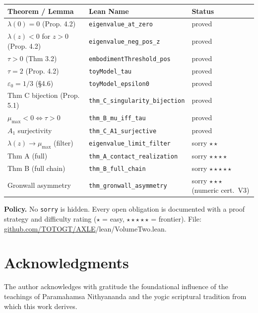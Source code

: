 \documentclass[11pt]{article}
\theoremstyle{boxed}
\begin{document}
\begin{longtable}{lll}
\toprule
\textbf{Theorem / Lemma} & \textbf{Lean Name} & \textbf{Status}\\
\midrule
\endhead
$\lambda(0) = 0$ (Prop. 4.2)                & \texttt{eigenvalue\_at\_zero}        & proved\\
$\lambda(z) < 0$ for $z>0$ (Prop. 4.2)      & \texttt{eigenvalue\_neg\_pos\_z}     & proved\\
$\tau > 0$ (Thm 3.2)                        & \texttt{embodimentThreshold\_pos}    & proved\\
$\tau = 2$ (Prop. 4.2)                      & \texttt{toyModel\_tau}               & proved\\
$\varepsilon_0 = 1/3$ (\S 4.6)              & \texttt{toyModel\_epsilon0}          & proved\\
Thm C bijection (Prop. 5.1)                 & \texttt{thm\_C\_singularity\_bijection} & proved\\
$\mu_{\max} < 0 \iff \tau > 0$              & \texttt{thm\_B\_mu\_iff\_tau}        & proved\\
$A_1$ surjectivity                          & \texttt{thm\_C\_A1\_surjective}      & proved\\
$\lambda(z) \to \mu_{\max}$ (filter)        & \texttt{eigenvalue\_limit\_filter}   & sorry $\star\star$\\
Thm A (full)                                & \texttt{thm\_A\_contact\_realization} & sorry $\star\star\star\star$\\
Thm B (full chain)                          & \texttt{thm\_B\_full\_chain}         & sorry $\star\star\star\star\star$\\
Gronwall asymmetry                          & \texttt{thm\_gronwall\_asymmetry}    & sorry $\star\star\star$ (numeric cert.\ V3)\\
\bottomrule
\end{longtable}

\textbf{Policy.} No \texttt{sorry} is hidden. Every open obligation is documented with
a proof strategy and difficulty rating ($\star$ = easy, $\star\star\star\star\star$ = frontier).
File: \href{https://github.com/TOTOGT/AXLE}{github.com/TOTOGT/AXLE}/lean/VolumeTwo.lean.

\section*{Acknowledgments}

The author acknowledges with gratitude the foundational influence of the teachings
of Paramahamsa Nithyananda and the yogic scriptural tradition from which this work derives.
\end{document}

